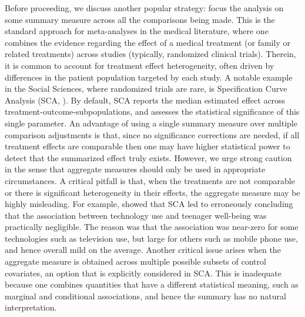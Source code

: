 \documentclass[pdflatex,sn-mathphys-num]{sn-jnl}%
\theoremstyle{thmstyleone}%
\theoremstyle{thmstyletwo}%
\theoremstyle{thmstylethree}%
\begin{document}
Before proceeding, we discuss another popular strategy: focus the analysis on some summary measure across all the comparisons being made. 
This is the standard approach for meta-analyses in the medical literature, where one combines the evidence regarding the effect of a medical treatment (or family or related treatments) across studies (typically, randomized clinical trials). Therein, it is common to account for treatment effect heterogeneity, often driven by differences in the patient population targeted by each study.
A notable example in the Social Sciences, where randomized trials are rare, is Specification Curve Analysis (SCA, \cite{simonsohn:2020}). By default, SCA reports the median estimated effect across treatment-outcome-subpopulations, and assesses the statistical significance of this single parameter.
An advantage of using a single summary measure over multiple comparison adjustments is that, since no significance corrections are needed, if all treatment effects are comparable then one may have higher statistical power to detect that the summarized effect truly exists.
However, we urge strong caution in the sense that aggregate measures should only be used in appropriate circumstances.
A critical pitfall is that, when the treatments are not comparable or there is significant heterogeneity in their effects, the aggregate measure may be highly misleading.
For example, \cite{semken:2022} showed that SCA led \cite{orben:2019} to erroneously concluding that the association between technology use and teenager well-being was practically negligible. The reason was that the association was near-zero for some technologies such as television use, but large for others such as mobile phone use, and hence overall mild on the average.
Another critical issue arises when the aggregate measure is obtained across multiple possible subsets of control covariates, an option that is explicitly considered in SCA.
This is inadequate because one combines quantities that have a different statistical meaning, such as marginal and conditional associations, and hence the summary has no natural interpretation. %
\end{document}

